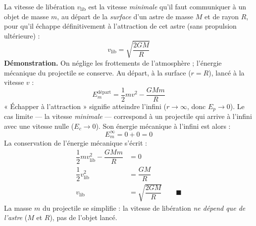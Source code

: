 \documentclass[11pt]{article}
\newcommand{\cle}[1]{{\popxbold\color{popdark}#1}}
\begin{document}
\begin{definition}
La \cle{vitesse de libération} $v_{\text{lib}}$ est la vitesse \emph{minimale} qu'il faut communiquer à un objet de masse $m$, au départ de la \emph{surface} d'un astre de masse $M$ et de rayon $R$, pour qu'il échappe définitivement à l'attraction de cet astre (sans propulsion ultérieure) :
\[ \boxed{v_{\text{lib}} = \sqrt{\dfrac{2GM}{R}}} \]
\textbf{Démonstration.} On néglige les frottements de l'atmosphère ; l'énergie mécanique du projectile se conserve. Au départ, à la surface ($r = R$), lancé à la vitesse $v$ :
\[ E_m^{\text{départ}} = \dfrac{1}{2}mv^2 - \dfrac{GMm}{R} \]
« Échapper à l'attraction » signifie atteindre l'infini ($r \to \infty$, donc $E_p \to 0$). Le cas limite — la vitesse \emph{minimale} — correspond à un projectile qui arrive à l'infini avec une vitesse nulle ($E_c \to 0$). Son énergie mécanique à l'infini est alors :
\[ E_m^{\infty} = 0 + 0 = 0 \]
La conservation de l'énergie mécanique s'écrit :
\begin{align*}
\dfrac{1}{2}mv_{\text{lib}}^2 - \dfrac{GMm}{R} &= 0 \\
\dfrac{1}{2}v_{\text{lib}}^2 &= \dfrac{GM}{R} \\
v_{\text{lib}} &= \sqrt{\dfrac{2GM}{R}} \qquad \blacksquare
\end{align*}
La masse $m$ du projectile se simplifie : la vitesse de libération \emph{ne dépend que de l'astre} ($M$ et $R$), pas de l'objet lancé.
\end{definition}
\end{document}
